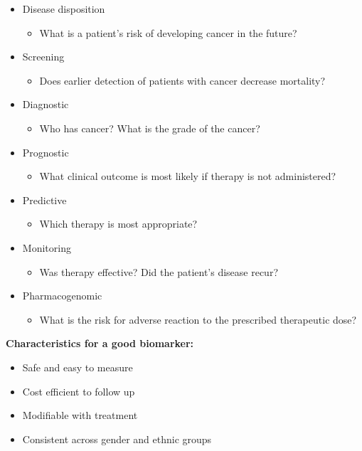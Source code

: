 \documentclass[UKenglish]{ifimaster}
\begin{document}
\begin{itemize}
    \item Disease disposition
        \begin{itemize}
            \item What is a patient's risk of developing cancer in the future?
        \end{itemize}
    \item Screening
        \begin{itemize}
            \item Does earlier detection of patients with cancer decrease mortality?
        \end{itemize}
    \item Diagnostic
        \begin{itemize}
            \item Who has cancer? What is the grade of the cancer?
        \end{itemize}
    \item Prognostic
        \begin{itemize}
            \item What clinical outcome is most likely if therapy is not administered?
        \end{itemize}
    \item Predictive
        \begin{itemize}
            \item Which therapy is most appropriate?
        \end{itemize}
    \item Monitoring
        \begin{itemize}
            \item Was therapy effective? Did the patient's disease recur?
        \end{itemize}
    \item Pharmacogenomic
        \begin{itemize}
            \item What is the risk for adverse reaction to the prescribed therapeutic dose?
        \end{itemize}
\end{itemize}
\textbf{Characteristics for a good biomarker:}
\begin{itemize}
    \item Safe and easy to measure
    \item Cost efficient to follow up
    \item Modifiable with treatment
    \item Consistent across gender and ethnic groups
\end{itemize}
\end{document}
